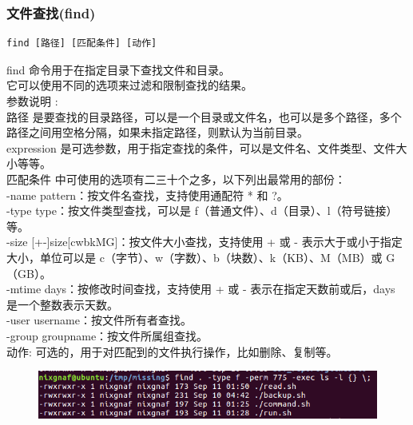 \documentclass{article}
\begin{document}
\subsubsection{文件查找(find)}
\begin{lstlisting}[style=myStyle]
find [路径] [匹配条件] [动作]
\end{lstlisting}
find 命令用于在指定目录下查找文件和目录。\\
它可以使用不同的选项来过滤和限制查找的结果。\\
参数说明 :\\
路径 是要查找的目录路径，可以是一个目录或文件名，也可以是多个路径，多个路径之间用空格分隔，如果未指定路径，则默认为当前目录。\\
expression 是可选参数，用于指定查找的条件，可以是文件名、文件类型、文件大小等等。\\
匹配条件 中可使用的选项有二三十个之多，以下列出最常用的部份：\\
-name pattern：按文件名查找，支持使用通配符 * 和 ?。\\
-type type：按文件类型查找，可以是 f（普通文件）、d（目录）、l（符号链接）等。\\
-size [+-]size[cwbkMG]：按文件大小查找，支持使用 + 或 - 表示大于或小于指定大小，单位可以是 c（字节）、w（字数）、b（块数）、k（KB）、M（MB）或 G（GB）。\\
-mtime days：按修改时间查找，支持使用 + 或 - 表示在指定天数前或后，days 是一个整数表示天数。\\
-user username：按文件所有者查找。\\
-group groupname：按文件所属组查找。\\
动作: 可选的，用于对匹配到的文件执行操作，比如删除、复制等。\\
\begin{figure}[h]
    \centering
    \includegraphics[width=0.5\linewidth]{image19.png}
\end{figure}
\end{document}
